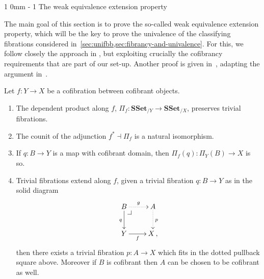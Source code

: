 \documentclass[reqno,10pt,a4paper,oneside]{amsart}
\makeatletter
\renewcommand{\section}{\@startsection
{section}%
{1}%
{0mm}%
{-\baselineskip}%
{1\baselineskip}%
{\Large \bfseries}}%
\numberwithin{equation}{section}
\theoremstyle{mythm}
\theoremstyle{mydef}
\theoremstyle{myrmk}
\newcommand{\pullback}[1]{\save*!/#1-1.2pc/#1:(-1,1)@^{|-}\restore}
\newcommand{\drpullback}{\pullback{dr}}
\newcommand{\ie}{\text{i.e.\ }}
\newcommand{\co}{\colon}
\newcommand{\SSet}{\mathbf{SSet}}
\makeatother
\begin{document}
\section{The weak equivalence extension property}
\label{sec:equep}

The main goal of this section is to prove the so-called weak equivalence extension property, which will be the key to prove the univalence of the classifying fibrations considered in~\cref{sec:unifbb,sec:fibrancy-and-univalence}.  For this, we follow closely the approach in \cite{voevodsky-simplicial-model}, but exploiting crucially the cofibrancy requirements that are part of our set-up. Another proof is given in~\cite[Section~3.2]{GambinoN:anocp}, adapting the argument in~\cite{SattlerC:equepu}.



\begin{lemma}\label{Lemma:ForTheExtProperty} Let  $f \co Y \rightarrow X$ be a cofibration between
cofibrant objects. 
\begin{enumerate}[$(i)$]
\item The dependent product along $f$, $\Pi_f \co \SSet_{/Y} \rightarrow \SSet_{/X}$, preserves trivial fibrations.
\item The counit of the adjunction $f^* \dashv \Pi_f$ is a natural isomorphism.
\item If $q \co B \to Y$ is a map with cofibrant domain, then $\Pi_f(q) \co \Pi_Y(B) \to X$  is so.
\item Trivial fibrations extend along $f$, \ie given a trivial fibration $q
 \co B \to Y$  as in the solid diagram
\[
\xymatrix{
B \ar@{.>}[r]^{g} \ar[d]_{q} \drpullback  & A \ar@{.>}[d]^{p} \\
Y \ar[r]_-f &  X \, ,}
\]
then there exists a trivial fibration $p \co A \rightarrow X$ which fits in the dotted pullback square above. Moreover if $B$ is cofibrant  then 
$A$ can be chosen to be 
cofibrant as well.
\end{enumerate}
\end{lemma}
\end{document}
